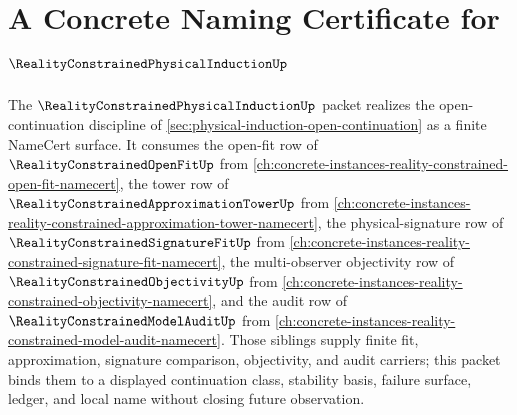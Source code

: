 \chapter{A Concrete Naming Certificate for $\RealityConstrainedPhysicalInductionUp$}
\label{ch:concrete-instances-reality-constrained-physical-induction-namecert}

The $\RealityConstrainedPhysicalInductionUp$ packet realizes the open-continuation discipline of \autoref{sec:physical-induction-open-continuation} as a finite NameCert surface. It consumes the open-fit row of $\RealityConstrainedOpenFitUp$ from \autoref{ch:concrete-instances-reality-constrained-open-fit-namecert}, the tower row of $\RealityConstrainedApproximationTowerUp$ from \autoref{ch:concrete-instances-reality-constrained-approximation-tower-namecert}, the physical-signature row of $\RealityConstrainedSignatureFitUp$ from \autoref{ch:concrete-instances-reality-constrained-signature-fit-namecert}, the multi-observer objectivity row of $\RealityConstrainedObjectivityUp$ from \autoref{ch:concrete-instances-reality-constrained-objectivity-namecert}, and the audit row of $\RealityConstrainedModelAuditUp$ from \autoref{ch:concrete-instances-reality-constrained-model-audit-namecert}. Those siblings supply finite fit, approximation, signature comparison, objectivity, and audit carriers; this packet binds them to a displayed continuation class, stability basis, failure surface, ledger, and local name without closing future observation.

